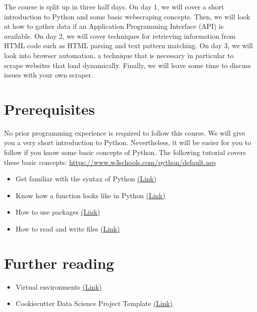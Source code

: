 \documentclass[a4paper]{article}
\begin{document}
The course is split up in three half days. On day 1, we will cover a short introduction to Python and some basic webscraping concepts. Then, we will look at how to gather data if an Application Programming Interface (API) is available. On day 2, we will cover techniques for retrieving information from HTML code such as HTML parsing and text pattern matching. On day 3, we will look into browser automation, a technique that is necessary in particular to scrape websites that load dynamically. Finally, we will leave some time to discuss issues with your own scraper.

\section{Prerequisites}

No prior programming experience is required to follow this course. We
will give you a very short introduction to Python. Nevertheless, it
will be easier for you to follow if you know some basic concepts of
Python. The following tutorial covers these basic concepts:
\url{https://www.w3schools.com/python/default.asp}

\begin{itemize}[itemsep=2pt]
    \item Get familiar with the syntax of Python  \href{https://www.w3schools.com/python/python_syntax.asp}{(Link)}
    \item Know how a function looks like in Python \href{https://www.w3schools.com/python/python_functions.asp}{(Link)}
    \item How to use packages \href{https://www.w3schools.com/python/python_pip.asp}{(Link)}
    \item How to read and write files \href{https://www.w3schools.com/python/python_file_handling.asp}{(Link)}
\end{itemize}

\section{Further reading}

\begin{itemize}
    \item Virtual environments \href{https://docs.python.org/3/tutorial/venv.html}{(Link)}
    \item Cookiecutter Data Science Project Template \href{http://drivendata.github.io/cookiecutter-data-science/}{(Link)}
\end{itemize}
\end{document}
